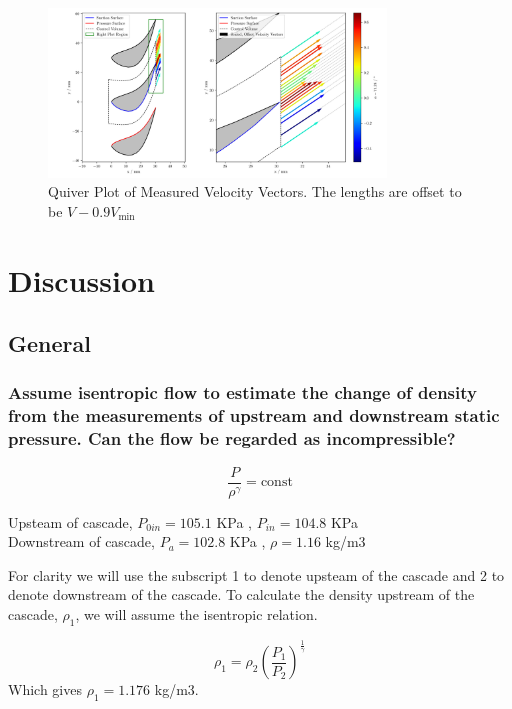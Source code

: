 \documentclass{article}
\begin{document}
\begin{figure}[H]
    \centering
    \includegraphics[width=0.8\textwidth]{figures/quiver_plot.png}
    \caption{Quiver Plot of Measured Velocity Vectors. The lengths are offset to be $V-0.9V_\text{min}$}
    \label{fig:quiver_plot}
\end{figure}


\section{Discussion}

\subsection{General}

\subsubsection{ Assume isentropic flow to estimate the change of density from the measurements of
upstream and downstream static pressure. Can the flow be regarded as incompressible?}

\begin{equation}
    \frac{P}{\rho^\gamma} = \text{const}
\end{equation}

Upsteam of cascade, $P_{0in} = 105.1$ KPa , $P_{in} = 104.8$ KPa \\
Downstream of cascade,  $P_a = 102.8$ KPa , $\rho = 1.16$ kg/m3

For clarity we will use the subscript 1 to denote upsteam of the cascade and 2 to denote downstream of the cascade.
To calculate the density upstream of the cascade, $\rho_1$, we will assume the isentropic relation.

\begin{equation}
    \rho_1 = \rho_2 \left( \frac{P_1}{P_2} \right)^\frac{1}{\gamma}
\end{equation}
Which gives $\rho_1 = 1.176$ kg/m3.
\end{document}
